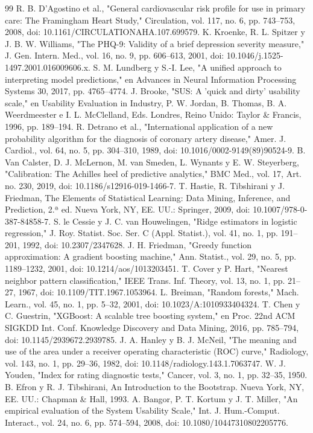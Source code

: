 \documentclass[conference]{IEEEtran}
\begin{document}
\begin{thebibliography}{99}
 R. B. D'Agostino et al., "General cardiovascular risk profile for use in primary care: The Framingham Heart Study," Circulation, vol. 117, no. 6, pp. 743–753, 2008, doi: 10.1161/CIRCULATIONAHA.107.699579.
 K. Kroenke, R. L. Spitzer y J. B. W. Williams, "The PHQ-9: Validity of a brief depression severity measure," J. Gen. Intern. Med., vol. 16, no. 9, pp. 606–613, 2001, doi: 10.1046/j.1525-1497.2001.016009606.x.
 S. M. Lundberg y S.-I. Lee, "A unified approach to interpreting model predictions," en Advances in Neural Information Processing Systems 30, 2017, pp. 4765–4774.
 J. Brooke, "SUS: A 'quick and dirty' usability scale," en Usability Evaluation in Industry, P. W. Jordan, B. Thomas, B. A. Weerdmeester e I. L. McClelland, Eds. Londres, Reino Unido: Taylor \& Francis, 1996, pp. 189–194.
 R. Detrano et al., "International application of a new probability algorithm for the diagnosis of coronary artery disease," Amer. J. Cardiol., vol. 64, no. 5, pp. 304–310, 1989, doi: 10.1016/0002-9149(89)90524-9.
 B. Van Calster, D. J. McLernon, M. van Smeden, L. Wynants y E. W. Steyerberg, "Calibration: The Achilles heel of predictive analytics," BMC Med., vol. 17, Art. no. 230, 2019, doi: 10.1186/s12916-019-1466-7.
 T. Hastie, R. Tibshirani y J. Friedman, The Elements of Statistical Learning: Data Mining, Inference, and Prediction, 2.ª ed. Nueva York, NY, EE. UU.: Springer, 2009, doi: 10.1007/978-0-387-84858-7.
 S. le Cessie y J. C. van Houwelingen, "Ridge estimators in logistic regression," J. Roy. Statist. Soc. Ser. C (Appl. Statist.), vol. 41, no. 1, pp. 191–201, 1992, doi: 10.2307/2347628.
 J. H. Friedman, "Greedy function approximation: A gradient boosting machine," Ann. Statist., vol. 29, no. 5, pp. 1189–1232, 2001, doi: 10.1214/aos/1013203451.
 T. Cover y P. Hart, "Nearest neighbor pattern classification," IEEE Trans. Inf. Theory, vol. 13, no. 1, pp. 21–27, 1967, doi: 10.1109/TIT.1967.1053964.
 L. Breiman, "Random forests," Mach. Learn., vol. 45, no. 1, pp. 5–32, 2001, doi: 10.1023/A:1010933404324.
 T. Chen y C. Guestrin, "XGBoost: A scalable tree boosting system," en Proc. 22nd ACM SIGKDD Int. Conf. Knowledge Discovery and Data Mining, 2016, pp. 785–794, doi: 10.1145/2939672.2939785.
 J. A. Hanley y B. J. McNeil, "The meaning and use of the area under a receiver operating characteristic (ROC) curve," Radiology, vol. 143, no. 1, pp. 29–36, 1982, doi: 10.1148/radiology.143.1.7063747.
 W. J. Youden, "Index for rating diagnostic tests," Cancer, vol. 3, no. 1, pp. 32–35, 1950.
 B. Efron y R. J. Tibshirani, An Introduction to the Bootstrap. Nueva York, NY, EE. UU.: Chapman \& Hall, 1993.
 A. Bangor, P. T. Kortum y J. T. Miller, "An empirical evaluation of the System Usability Scale," Int. J. Hum.-Comput. Interact., vol. 24, no. 6, pp. 574–594, 2008, doi: 10.1080/10447310802205776.
\end{thebibliography}
\end{document}
